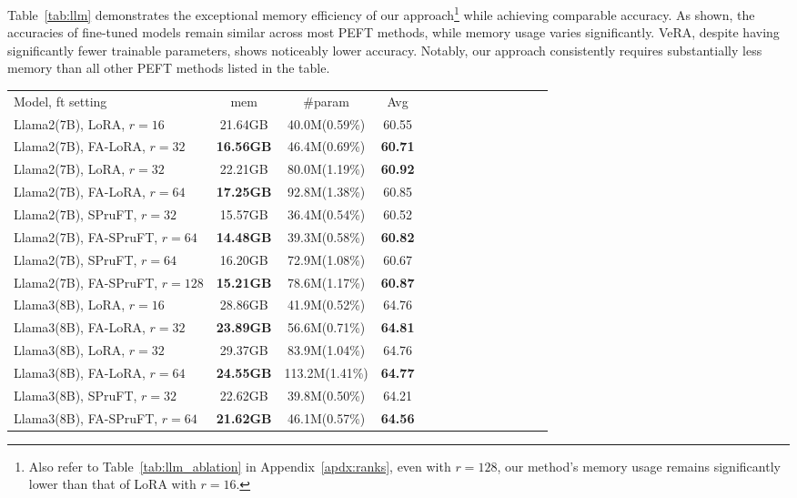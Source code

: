 Table~\ref{tab:llm} demonstrates the exceptional memory efficiency of our approach\footnote{Also refer to Table~\ref{tab:llm_ablation} in Appendix~\ref{apdx:ranks}, even with $r=128$, our method's memory usage remains significantly lower than that of LoRA with $r=16$.} while achieving comparable accuracy. As shown, the accuracies of fine-tuned models remain similar across most PEFT methods, while memory usage varies significantly. VeRA, despite having significantly fewer trainable parameters, shows noticeably lower accuracy. Notably, our approach consistently requires substantially less memory than all other PEFT methods listed in the table.

\begin{table}[htbp]
\tiny
\begin{center}
\begin{tabular}{lccccccccccccc}\toprule
Model, ft setting & mem & \#param & Avg \\\cmidrule(lr){1-4}
Llama2(7B), LoRA, $r=16$ & 21.64GB & 40.0M(0.59\%) & 60.55\\
Llama2(7B), FA-LoRA, $r=32$ & \textbf{16.56GB} & 46.4M(0.69\%) & \textbf{60.71}\\\cmidrule(lr){2-4}
Llama2(7B), LoRA, $r=32$ & 22.21GB & 80.0M(1.19\%) & \textbf{60.92} \\
Llama2(7B), FA-LoRA, $r=64$ & \textbf{17.25GB} & 92.8M(1.38\%)  & 60.85 \\\cmidrule(lr){2-4}
Llama2(7B), SPruFT, $r=32$ & 15.57GB & 36.4M(0.54\%) & 60.52 \\
Llama2(7B), FA-SPruFT, $r=64$ & \textbf{14.48GB} & 39.3M(0.58\%) & \textbf{60.82} \\\cmidrule(lr){2-4}
Llama2(7B), SPruFT, $r=64$ & 16.20GB & 72.9M(1.08\%) & 60.67 \\
Llama2(7B), FA-SPruFT, $r=128$ & \textbf{15.21GB} & 78.6M(1.17\%) & \textbf{60.87} \\\midrule
Llama3(8B), LoRA, $r=16$ & 28.86GB & 41.9M(0.52\%) & 64.76 \\
Llama3(8B), FA-LoRA, $r=32$ & \textbf{23.89GB} & 56.6M(0.71\%) & \textbf{64.81} \\\cmidrule(lr){2-4}
Llama3(8B), LoRA, $r=32$ & 29.37GB & 83.9M(1.04\%) & 64.76 \\
Llama3(8B), FA-LoRA, $r=64$ & \textbf{24.55GB} & 113.2M(1.41\%) & \textbf{64.77} \\\cmidrule(lr){2-4}
Llama3(8B), SPruFT, $r=32$ & 22.62GB & 39.8M(0.50\%) & 64.21 \\
Llama3(8B), FA-SPruFT, $r=64$ & \textbf{21.62GB} & 46.1M(0.57\%) & \textbf{64.56} \\\cmidrule(lr){2-4}

\end{tabular}
\end{center}
\end{table}
